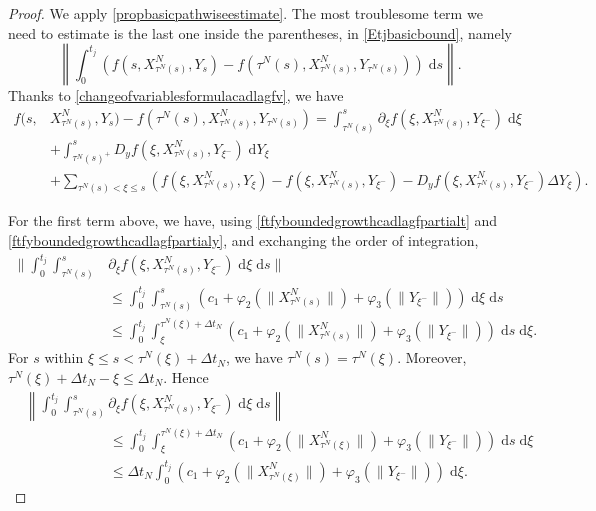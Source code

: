 \documentclass[reqno,12pt]{amsart}
\theoremstyle{plain} %
\theoremstyle{definition} %
\begin{document}
\begin{proof}
    We apply \cref{propbasicpathwiseestimate}. The most troublesome term we need to estimate is the last one inside the parentheses, in \eqref{Etjbasicbound}, namely
    \[
        \left\|\int_0^{t_j} \left( f(s, X_{\tau^N(s)}^N, Y_s) - f(\tau^N(s), X_{\tau^N(s)}^N, Y_{\tau^N(s)}) \right)\;\mathrm{d}s\right\|.
    \]
    Thanks to \eqref{changeofvariablesformulacadlagfv}, we have
    \begin{align*}
        f(s, & X_{\tau^N(s)}^N, Y_s) - f(\tau^N(s), X_{\tau^N(s)}^N, Y_{\tau^N(s)}) = \int_{\tau^N(s)}^s \partial_\xi f(\xi, X_{\tau^N(s)}^N, Y_{\xi^-})\;\mathrm{d}\xi \\
        & + \int_{\tau^N(s)^+}^s D_y f(\xi, X_{\tau^N(s)}^N, Y_{\xi^-}) \;\mathrm{d}Y_\xi \\
        & + \sum_{\tau^N(s) < \xi \leq s} \left(f(\xi, X_{\tau^N(s)}^N, Y_\xi) - f(\xi, X_{\tau^N(s)}^N, Y_{\xi^{-}}) - D_y f(\xi, X_{\tau^N(s)}^N, Y_{\xi^-})\Delta Y_\xi\right).
    \end{align*}
    
    For the first term above, we have, using \eqref{ftfyboundedgrowthcadlagfpartialt} and \eqref{ftfyboundedgrowthcadlagfpartialy}, and exchanging the order of integration,
    \begin{align*}
        \bigg\|\int_0^{t_j} \int_{\tau^N(s)}^s & \partial_\xi f(\xi, X_{\tau^N(s)}^N, Y_{\xi^-}) \;\mathrm{d}\xi\;\mathrm{d}s\bigg\| \\
        & \leq \int_0^{t_j} \int_{\tau^N(s)}^s \left(c_1 + \varphi_2(\|X_{\tau^N(s)}^N\|) + \varphi_3(\|Y_{\xi^-}\|)\right)\;\mathrm{d}\xi\;\mathrm{d}s \\
        & \leq \int_0^{t_j} \int_{\xi}^{\tau^N(\xi) + \Delta t_N} \left(c_1 + \varphi_2(\|X_{\tau^N(s)}^N\|) + \varphi_3(\|Y_{\xi^-}\|)\right)\;\mathrm{d}s\;\mathrm{d}\xi.
    \end{align*}
    For $s$ within $\xi \leq s < \tau^N(\xi) + \Delta t_N$, we have $\tau^N(s) = \tau^N(\xi)$. Moreover, $\tau^N(\xi) + \Delta t_N- \xi \leq \Delta t_N$. Hence
    \begin{equation}
        \label{ordercadlagfvterm1}
        \begin{aligned}
            & \left\|\int_0^{t_j} \int_{\tau^N(s)}^s \partial_\xi f(\xi, X_{\tau^N(s)}^N, Y_{\xi^-})\;\mathrm{d}\xi\;\mathrm{d}s\right\| \\
            & \qquad \qquad \qquad \leq \int_0^{t_j} \int_{\xi}^{\tau^N(\xi) + \Delta t_N} \left(c_1 + \varphi_2(\|X_{\tau^N(\xi)}^N\|) + \varphi_3(\|Y_{\xi^-}\|)\right)\;\mathrm{d}s\;\mathrm{d}\xi \\
            & \qquad \qquad \qquad \leq \Delta t_N\int_0^{t_j} \left(c_1 + \varphi_2(\|X_{\tau^N(\xi)}^N\|) + \varphi_3(\|Y_{\xi^-}\|)\right)\;\mathrm{d}\xi.
        \end{aligned}
    \end{equation}


\end{proof}
\end{document}
